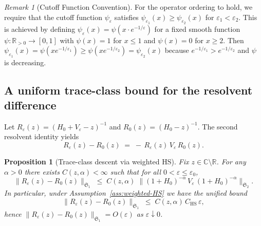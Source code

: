 ﻿\documentclass[12pt,a4paper]{article}
\newtheorem{proposition}[theorem]{Proposition}
\theoremstyle{definition}
\theoremstyle{remark}
\newtheorem{remark}[theorem]{Remark}
\newcommand{\RR}{\mathbb{R}}
\begin{document}
\begin{remark}[Cutoff Function Convention]
\label{rem:cutoff-convention}
For the operator ordering to hold, we require that the cutoff function $\psi_\varepsilon$ satisfies $\psi_{\varepsilon_1}(x) \geq \psi_{\varepsilon_2}(x)$ for $\varepsilon_1 < \varepsilon_2$. This is achieved by defining $\psi_\varepsilon(x) = \psi(x \cdot e^{-1/\varepsilon})$ for a fixed smooth function $\psi : \RR_{>0} \to [0,1]$ with $\psi(x) = 1$ for $x \leq 1$ and $\psi(x) = 0$ for $x \geq 2$. Then $\psi_{\varepsilon_1}(x) = \psi(x e^{-1/\varepsilon_1}) \geq \psi(x e^{-1/\varepsilon_2}) = \psi_{\varepsilon_2}(x)$ because $e^{-1/\varepsilon_1} > e^{-1/\varepsilon_2}$ and $\psi$ is decreasing.
\end{remark}

\subsection{A uniform trace-class bound for the resolvent difference}
\label{subsec:trace-class-descent}

Let $R_\varepsilon(z)=(H_0+V_\varepsilon - z)^{-1}$ and $R_0(z)=(H_0-z)^{-1}$.
The second resolvent identity yields
\begin{equation}\label{eq:second-resolvent}
  R_\varepsilon(z)-R_0(z) \;=\; -\,R_\varepsilon(z)\,V_\varepsilon\,R_0(z).
\end{equation}

\begin{proposition}[Trace-class descent via weighted HS]
\label{prop:trace-class-descent}
Fix $z\in\mathbb{C}\setminus\mathbb{R}$. For any $\alpha>0$ there exists
$C(z,\alpha)<\infty$ such that for all $0<\varepsilon\le\varepsilon_0$,
\begin{equation}\label{eq:S1-master}
  \|R_\varepsilon(z)-R_0(z)\|_{\mathfrak{S}_1}
  \;\le\; C(z,\alpha)\;
  \big\|(1+H_0)^{-\alpha}\,V_\varepsilon\,(1+H_0)^{-\alpha}\big\|_{\mathfrak{S}_2}.
\end{equation}
In particular, under Assumption~\ref{ass:weighted-HS} we have the unified bound
\begin{equation}\label{eq:S1-eps}
  \|R_\varepsilon(z)-R_0(z)\|_{\mathfrak{S}_1}
  \;\le\; C(z,\alpha)\,C_{\mathrm{HS}}\,\varepsilon,
\end{equation}
hence $\|R_\varepsilon(z)-R_0(z)\|_{\mathfrak{S}_1}=O(\varepsilon)$ as
$\varepsilon\downarrow 0$.
\end{proposition}
\end{document}
